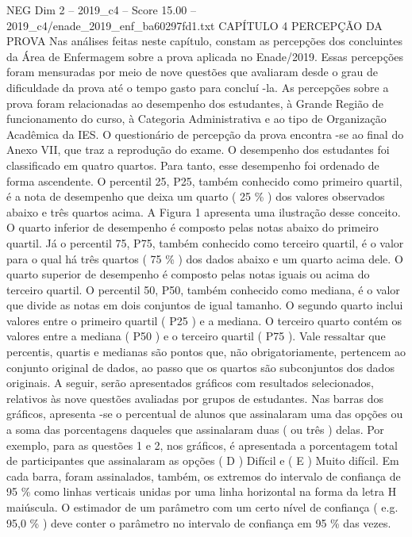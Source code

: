 \begin{textsample}{NEG Dim 2 – 2019\_c4 – Score 15.00 – 2019\_c4/enade\_2019\_enf\_ba60297fd1.txt}  \label{ex:f2_neg_388}
CAPÍTULO 4 PERCEPÇÃO DA PROVA Nas análises feitas neste capítulo, constam as percepções dos concluintes da Área de Enfermagem sobre a prova aplicada no Enade/2019.
Essas percepções foram mensuradas por meio de nove questões que avaliaram desde o grau de dificuldade da prova até o tempo gasto para concluí -la.
As percepções sobre a prova foram relacionadas ao desempenho dos estudantes, à Grande Região de funcionamento do curso, à Categoria Administrativa e ao tipo de Organização Acadêmica da IES.
O questionário de percepção da prova encontra -se ao final do Anexo VII, que traz a reprodução do exame.
O desempenho dos estudantes foi classificado em quatro quartos.
Para tanto, esse desempenho foi ordenado de forma ascendente.
O percentil 25, P25, também conhecido como primeiro quartil, é a nota de desempenho que deixa um quarto ( 25 \% ) dos valores observados abaixo e três quartos acima.
A Figura 1 apresenta uma ilustração desse conceito.
O quarto inferior de desempenho é composto pelas notas abaixo do primeiro quartil.
Já o percentil 75, P75, também conhecido como terceiro quartil, é o valor para o qual há três quartos ( 75 \% ) dos dados abaixo e um quarto acima dele.
O quarto superior de desempenho é composto pelas notas iguais ou acima do terceiro quartil.
O percentil 50, P50, também conhecido como mediana, é o valor que divide as notas em dois conjuntos de igual tamanho.
O segundo quarto inclui valores entre o primeiro quartil ( P25 ) e a mediana.
O terceiro quarto contém os valores entre a mediana ( P50 ) e o terceiro quartil ( P75 ).
Vale ressaltar que percentis, quartis e medianas são pontos que, não obrigatoriamente, pertencem ao conjunto original de dados, ao passo que os quartos são subconjuntos dos dados originais.
A seguir, serão apresentados gráficos com resultados selecionados, relativos às nove questões avaliadas por grupos de estudantes.
Nas barras dos gráficos, apresenta -se o percentual de alunos que assinalaram uma das opções ou a soma das porcentagens daqueles que assinalaram duas ( ou três ) delas.
Por exemplo, para as questões 1 e 2, nos gráficos, é apresentada a porcentagem total de participantes que assinalaram as opções ( D ) Difícil e ( E ) Muito difícil.
Em cada barra, foram assinalados, também, os extremos do intervalo de confiança de 95 \% como linhas verticais unidas por uma linha horizontal na forma da letra H maiúscula.
O estimador de um parâmetro com um certo nível de confiança ( e.g. 95,0 \% ) deve conter o parâmetro no intervalo de confiança em 95 \% das vezes.

\end{textsample}
